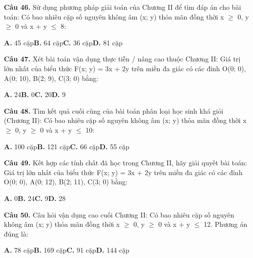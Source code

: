 \documentclass[11pt,a4paper]{article}
\begin{document}
\textbf{\color{primary} Câu 46.} Sử dụng phương pháp giải toán của Chương II để tìm đáp án cho bài toán: Có bao nhiêu cặp số nguyên không âm (x; y) thỏa mãn đồng thời x $\ge$ 0, y $\ge$ 0 và x + y $\le$ 8:\par
\hspace*{1.5em}\textbf{A.} 45 cặp\quad\quad \textbf{B.} 64 cặp\quad\quad \textbf{C.} 36 cặp\quad\quad \textbf{D.} 81 cặp\par\vspace{2pt}
\textbf{\color{primary} Câu 47.} Xét bài toán vận dụng thực tiễn / nâng cao thuộc Chương II: Giá trị lớn nhất của biểu thức F(x; y) = 3x + 2y trên miền đa giác có các đỉnh O(0; 0), A(0; 10), B(2; 9), C(3; 0) bằng:\par
\hspace*{1.5em}\textbf{A.} 24\quad\quad \textbf{B.} 0\quad\quad \textbf{C.} 20\quad\quad \textbf{D.} 9\par\vspace{2pt}
\textbf{\color{primary} Câu 48.} Tìm kết quả cuối cùng của bài toán phân loại học sinh khá giỏi (Chương II): Có bao nhiêu cặp số nguyên không âm (x; y) thỏa mãn đồng thời x $\ge$ 0, y $\ge$ 0 và x + y $\le$ 10:\par
\hspace*{1.5em}\textbf{A.} 100 cặp\quad\quad \textbf{B.} 121 cặp\quad\quad \textbf{C.} 66 cặp\quad\quad \textbf{D.} 55 cặp\par\vspace{2pt}
\textbf{\color{primary} Câu 49.} Kết hợp các tính chất đã học trong Chương II, hãy giải quyết bài toán: Giá trị lớn nhất của biểu thức F(x; y) = 3x + 2y trên miền đa giác có các đỉnh O(0; 0), A(0; 12), B(2; 11), C(3; 0) bằng:\par
\hspace*{1.5em}\textbf{A.} 0\quad\quad \textbf{B.} 24\quad\quad \textbf{C.} 9\quad\quad \textbf{D.} 28\par\vspace{2pt}
\textbf{\color{primary} Câu 50.} Câu hỏi vận dụng cao cuối Chương II: Có bao nhiêu cặp số nguyên không âm (x; y) thỏa mãn đồng thời x $\ge$ 0, y $\ge$ 0 và x + y $\le$ 12. Phương án đúng là:\par
\hspace*{1.5em}\textbf{A.} 78 cặp\quad\quad \textbf{B.} 169 cặp\quad\quad \textbf{C.} 91 cặp\quad\quad \textbf{D.} 144 cặp\par\vspace{2pt}
\end{document}
